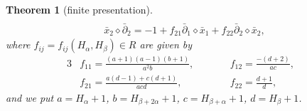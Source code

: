 \documentclass[10pt,a4paper]{amsart}
\numberwithin{equation}{section}
\newtheorem{Theorem}{Theorem}[section]
\begin{document}
\begin{Theorem}[finite presentation]
\begin{subequations}
\begin{gather}
			\\
			\label{eq:rel-x2p2}
			\bar x_2\diamond\bar \partial_2 =
			-1+f_{21}\bar \partial_1\diamond \bar x_1 +f_{22}\bar\partial_2\diamond\bar x_2,
		\end{gather}\end{subequations}
	where $f_{ij}=f_{ij}(H_\alpha,H_\beta)\in R$ are given by
	\begin{alignat}{3}
			& f_{11}=\frac{(a+1)(a-1)(b+1)}{a^2b}, \qquad&&
			f_{12}=\frac{-(d+2)}{ac},&\nonumber\\
			& f_{21}=\frac{a(d-1) + c(d+1)}{acd},\qquad&&
			f_{22}=\frac{d+1}{d},&\label{eq:abcdfij}
	\end{alignat}
	and we put $a=H_\alpha+1$, $ b=H_{\beta+2\alpha}+1$, $c=H_{\beta+\alpha}+1$, $d=H_\beta+1$.
\end{Theorem}
\end{document}

